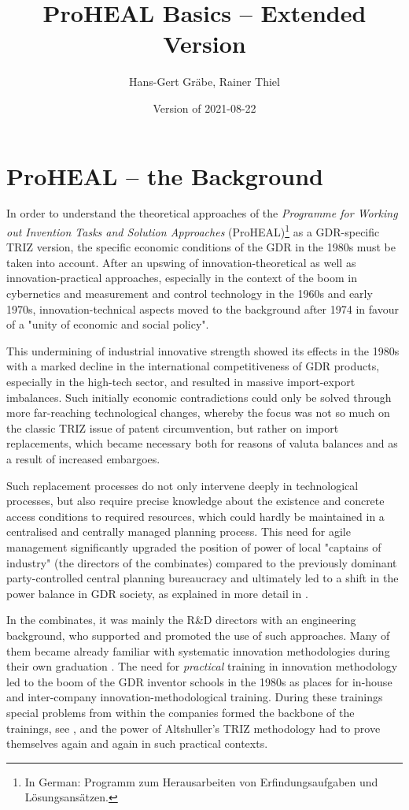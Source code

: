 \documentclass[11pt,a4paper]{article}
\title{ProHEAL Basics -- Extended Version}
\author{Hans-Gert Gr\"abe, Rainer Thiel}
\date{Version of 2021-08-22}
\begin{document}
\maketitle

\section{ProHEAL -- the Background}

In order to understand the theoretical approaches of the \emph{Programme for
  Working out Invention Tasks and Solution Approaches} (ProHEAL)\footnote{In
  German: Programm zum Herausarbeiten von Erfindungsaufgaben und
  Lösungsansätzen. } as a GDR-specific TRIZ version, the specific economic
conditions of the GDR in the 1980s must be taken into account. After an
upswing of innovation-theoretical as well as innovation-practical approaches,
especially in the context of the boom in cybernetics and measurement and
control technology in the 1960s and early 1970s, innovation-technical aspects
moved to the background after 1974 in favour of a "unity of economic and
social policy".

This undermining of industrial innovative strength showed its effects in the
1980s with a marked decline in the international competitiveness of GDR
products, especially in the high-tech sector, and resulted in massive
import-export imbalances. Such initially economic contradictions could only be
solved through more far-reaching technological changes, whereby the focus was
not so much on the classic TRIZ issue of patent circumvention, but rather on
import replacements, which became necessary both for reasons of valuta
balances and as a result of increased embargoes.

Such replacement processes do not only intervene deeply in technological
processes, but also require precise knowledge about the existence and concrete
access conditions to required resources, which could hardly be maintained in a
centralised and centrally managed planning process. This need for agile
management significantly upgraded the position of power of local "captains of
industry" (the directors of the combinates) compared to the previously
dominant party-controlled central planning bureaucracy and ultimately led to a
shift in the power balance in GDR society, as explained in more detail in
\cite{Barkleit}.

In the combinates, it was mainly the R\&D directors with an engineering
background, who supported and promoted the use of such approaches.  Many of
them became already familiar with systematic innovation methodologies during
their own graduation \cite{RM-23}. The need for \emph{practical} training in
innovation methodology led to the boom of the GDR inventor schools in the
1980s as places for in-house and inter-company innovation-methodological
training.  During these trainings special problems from within the companies
formed the backbone of the trainings, see \cite[part 1, ch. 3]{RT94}, and the
power of Altshuller's TRIZ methodology had to prove themselves again and again
in such practical contexts.
\end{document}
